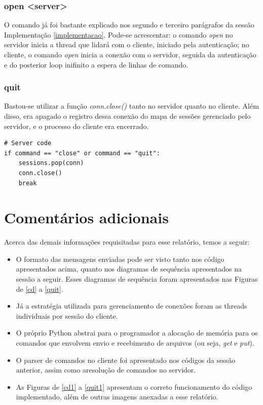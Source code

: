 \documentclass[conference]{IEEEtran}
\begin{document}
\subsubsection{open <server>} O comando já foi bastante explicado nos segundo e terceiro parágrafos da sessão Implementação \ref{implementacao}. Pode-se acrescentar: o comando \textit{open} no servidor inicia a thread que lidará com o cliente, iniciado pela autenticação; no cliente, o comando \textit{open} inicia a conexão com o servidor, seguida da autenticação e do posterior loop inifinito a espera de linhas de comando. 

\subsubsection{quit} Bastou-se utilizar a função \textit{conn.close()} tanto no servidor quanto no cliente. Além disso, era apagado o registro dessa conexão do mapa de sessões gerenciado pelo servidor, e o processo do cliente era encerrado.

\begin{lstlisting}
# Server code
if command == "close" or command == "quit":
	sessions.pop(conn)
	conn.close()
	break
\end{lstlisting}

\section{Comentários adicionais}

Acerca das demais informações requisitadas para esse relatório, temos a seguir:

\begin{itemize}
\item O formato das mensagens enviadas pode ser visto tanto nos código apresentados acima, quanto nos diagramas de sequência apresentados na sessão a seguir. Esses diagramas de sequência foram apresentados nas Figuras de \ref{cd} a \ref{quit}. 

\item Já a estratégia utilizada para gerenciamento de conexões foram as threads individuais por sessão do cliente.

\item O próprio Python abstrai para o programador a alocação de memória para os comandos que envolvem envio e recebimento de arquivos (ou seja, \textit{get} e \textit{put}).

\item O parser de comandos no cliente foi apresentado nos códigos da sessão anterior, assim como aresolução de comandos no servidor.

\item As Figuras de \ref{cd1} a \ref{quit1} apresentam o correto funcionamento do código implementado, além de outras imagens anexadas a esse relatório.

\end{itemize}
\end{document}
